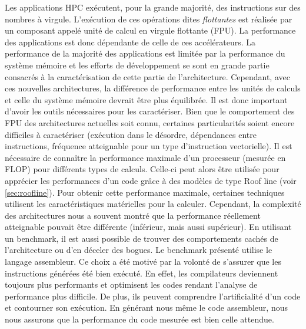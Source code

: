     Les applications HPC exécutent, pour la grande majorité, des instructions sur des nombres à virgule. L'exécution de ces opérations dites \textit{flottantes} est réalisée par un composant appelé unité de calcul en virgule flottante (FPU). La performance des applications est donc dépendante de celle de ces accélérateurs. La performance de la majorité des applications est limitée par la performance du système mémoire et les efforts de développement se sont en grande partie consacrés à la caractérisation de cette partie de l’architecture. Cependant, avec ces nouvelles architectures, la différence de performance entre les unités de calculs et celle du système mémoire devrait être plus équilibrée. Il est donc important d'avoir les outils nécessaires pour les caractériser.
    Bien que le comportement des FPU des architectures actuelles soit connu,  certaines particularités soient encore difficiles à caractériser (exécution dans le désordre, dépendances entre instructions, fréquence atteignable pour un type d'instruction vectorielle). 
    Il est nécessaire de connaître la performance maximale d'un processeur (mesurée en FLOP) pour différents types de calculs. Celle-ci peut alors être utilisée pour apprécier les performances d'un code grâce à des modèles de type Roof line (voir \autoref{sec:roofline}). Pour obtenir cette performance maximale, certaines techniques utilisent les caractéristiques matérielles pour la calculer. Cependant, la complexité des architectures nous a souvent montré que la performance réellement atteignable pouvait être différente (inférieur, mais aussi supérieur). En utilisant un benchmark, il est aussi possible de trouver des comportements cachés de l'architecture ou d'en déceler des bogues. 
    Le benchmark présenté utilise le langage assembleur. Ce choix a été motivé par la volonté de s'assurer que les instructions générées été bien exécuté. En effet, les compilateurs deviennent toujours plus performants et optimisent les codes rendant l'analyse de performance plus difficile. De plus, ils peuvent comprendre l'artificialité d'un code et contourner son exécution. En générant nous même le code assembleur, nous nous assurons que la performance du code mesurée est bien celle attendue.
    


   
    
    
    
